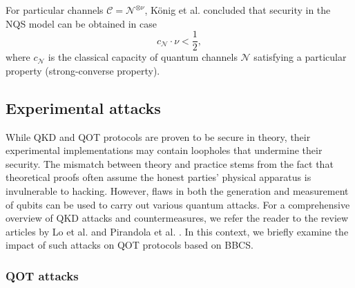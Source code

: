 



For particular channels $\mathcal{C} = \mathcal{N}^{\otimes \nu }$, K\"onig et al. \cite{KWW12} concluded that security in the NQS model can be obtained in case
$$c_{\mathcal{N}} \cdot \nu < \frac{1}{2},$$
where $c_{\mathcal{N}}$ is the classical capacity of quantum channels $\mathcal{N}$ satisfying a particular property (strong-converse property).


\subsection{Experimental attacks}

While QKD and QOT protocols are proven to be secure in theory, their experimental implementations may contain loopholes that undermine their security. The mismatch between theory and practice stems from the fact that theoretical proofs often assume the honest parties' physical apparatus is invulnerable to hacking. However, flaws in both the generation and measurement of qubits can be used to carry out various quantum attacks. For a comprehensive overview of QKD attacks and countermeasures, we refer the reader to the review articles by Lo et al. \cite{LCT14} and Pirandola et al. \cite{Pirandola2020}. In this context, we briefly examine the impact of such attacks on QOT protocols based on BBCS.

\subsubsection{QOT attacks}


